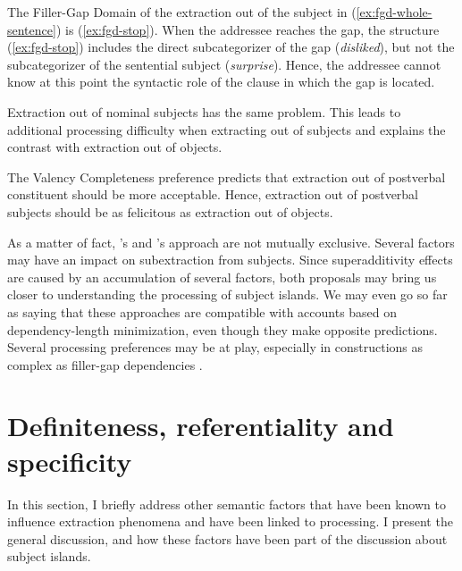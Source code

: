 The Filler-Gap Domain of the extraction out of the subject in (\ref{ex:fgd-whole-sentence}) is (\ref{ex:fgd-stop}).  When the addressee reaches the gap, the structure (\ref{ex:fgd-stop}) includes the direct subcategorizer of the gap (\emph{disliked}), but not the subcategorizer of the sentential subject (\emph{surprise}). Hence, the addressee cannot know at this point the syntactic role of the clause in which the gap is located. 

\eal \label{ex:fgd}
 \label{ex:fgd-whole-sentence}
 \label{ex:fgd-stop}
\zl 

Extraction out of nominal subjects has the same problem. This leads to additional processing difficulty when extracting out of subjects and explains the contrast with extraction out of objects.

The Valency Completeness preference predicts that extraction out of postverbal constituent should be more acceptable. Hence, extraction out of postverbal subjects should be as felicitous as extraction out of objects.


As a matter of fact, \citeauthor{Kluender.2004}'s and \citeauthor{Hawkins.1999}'s approach are not mutually exclusive. Several factors may have an impact on subextraction from subjects. Since superadditivity effects are caused by an accumulation of several factors, both proposals may bring us closer to understanding the processing of subject islands. We may even go so far as saying that these approaches are compatible with accounts based on dependency-length minimization, even though they make opposite predictions. Several processing preferences may be at play, especially in constructions as complex as filler-gap dependencies \citep[this is actually the view defended by][]{Hawkins.1999}.

\section{Definiteness, referentiality and specificity}
\label{ch:specificity-definiteness}

In this section, I briefly address other semantic factors that have been known to influence extraction phenomena and have been linked to processing. I present the general discussion, and how these factors have been part of the discussion about subject islands.


